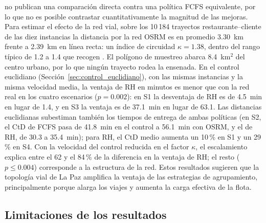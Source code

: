 \documentclass[12pt,letterpaper,oneside]{book}
\begin{document}
	\citet{Reyes2018} no publican una comparación directa contra una política FCFS
	equivalente, por lo que no es posible contrastar cuantitativamente la magnitud de las
	mejoras.  Para estimar el efecto de la red vial, sobre los 10\,184 trayectos
	restaurante--cliente de las diez instancias la distancia por la red OSRM es en promedio
	3.30~km frente a 2.39~km en línea recta: un índice de circuidad $\kappa = 1{.}38$, dentro del
	rango típico de 1.2 a 1.4 que recogen \citet{Boyaci2021}.  El polígono de muestreo abarca
	8.4~km$^2$ del centro urbano, por lo que ningún trayecto rodea la ensenada.  En el control
	euclidiano (Sección~\ref{sec:control_euclidiano}), con las mismas instancias y la misma
	velocidad media, la ventaja de RH en minutos es menor que con la red real en los cuatro
	escenarios ($p = 0{.}002$): en S1 la desventaja de RH es de 4.5~min en lugar de 1.4, y en S3
	la ventaja es de 37.1~min en lugar de 63.1.  Las distancias euclidianas subestiman también los
	tiempos de entrega de ambas políticas (en S2, el CtD de FCFS pasa de 41.8~min en el control a
	56.1~min con OSRM, y el de RH, de 30.3 a 35.4~min); para RH, el CtD medio aumenta un 10\,\% en
	S1 y un 29\,\% en S4.  Con la velocidad del control reducida en el factor $\kappa$, el
	escalamiento explica entre el 62 y el 84\,\% de la diferencia en la ventaja de RH; el resto
	($p \leq 0{.}004$) corresponde a la estructura de la red.  Estos resultados sugieren que la
	topología vial de La Paz amplifica la ventaja de las estrategias de agrupamiento,
	principalmente porque alarga los viajes y aumenta la carga efectiva de la flota.

	\subsection{Limitaciones de los resultados}
	\label{sec:limitaciones_resultados}
\end{document}
